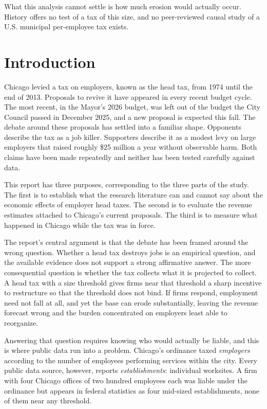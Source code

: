 \documentclass[12pt,letterpaper]{article}
\begin{document}
What this analysis cannot settle is how much erosion would actually occur. History offers no test of a tax of this size, and no peer-reviewed causal study of a U.S. municipal per-employee tax exists.

\newpage

\tableofcontents
\newpage

\section{Introduction}

Chicago levied a tax on employers, known as the head tax, from 1974 until the end of 2013. Proposals to revive it have appeared in every recent budget cycle. The most recent, in the Mayor's 2026 budget, was left out of the budget the City Council passed in December 2025, and a new proposal is expected this fall. The debate around these proposals has settled into a familiar shape. Opponents describe the tax as a job killer. Supporters describe it as a modest levy on large employers that raised roughly \$25 million a year without observable harm. Both claims have been made repeatedly and neither has been tested carefully against data.

This report has three purposes, corresponding to the three parts of the study. The first is to establish what the research literature can and cannot say about the economic effects of employer head taxes. The second is to evaluate the revenue estimates attached to Chicago's current proposals. The third is to measure what happened in Chicago while the tax was in force.

The report's central argument is that the debate has been framed around the wrong question. Whether a head tax destroys jobs is an empirical question, and the available evidence does not support a strong affirmative answer. The more consequential question is whether the tax collects what it is projected to collect. A head tax with a size threshold gives firms near that threshold a sharp incentive to restructure so that the threshold does not bind. If firms respond, employment need not fall at all, and yet the base can erode substantially, leaving the revenue forecast wrong and the burden concentrated on employers least able to reorganize.

Answering that question requires knowing who would actually be liable, and this is where public data run into a problem. Chicago's ordinance taxed \textit{employers} according to the number of employees performing services within the city. Every public data source, however, reports \textit{establishments}: individual worksites. A firm with four Chicago offices of two hundred employees each was liable under the ordinance but appears in federal statistics as four mid-sized establishments, none of them near any threshold.
\end{document}

